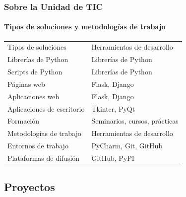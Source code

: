 \documentclass{beamer}
\begin{document}
	\begin{frame}
		\frametitle{Sobre la Unidad de TIC}
		\framesubtitle{Tipos de soluciones y metodologías de trabajo}
		\centering
		\begin{tabular}{ll}
			\rowcolor{blue!40}
			{\color{white}Tipos de soluciones}&{\color{white}Herramientas de desarrollo}\\
			Librerías de Python&Librerías de Python\\
			Scripts de Python&Librerías de Python\\
			Páginas web&Flask, Django\\
			Aplicaciones web&Flask, Django\\
			Aplicaciones de escritorio&Tkinter, PyQt\\
			Formación&Seminarios, cursos, prácticas\\
			\rowcolor{blue!40}
			{\color{white}Metodologías de trabajo}&{\color{white}Herramientas de desarrollo}\\
			Entornos de trabajo&PyCharm, Git, GitHub\\
			Plataformas de difusión&GitHub, PyPI\\
		\end{tabular}
	\end{frame}

	\subsection{Proyectos}
\end{document}

